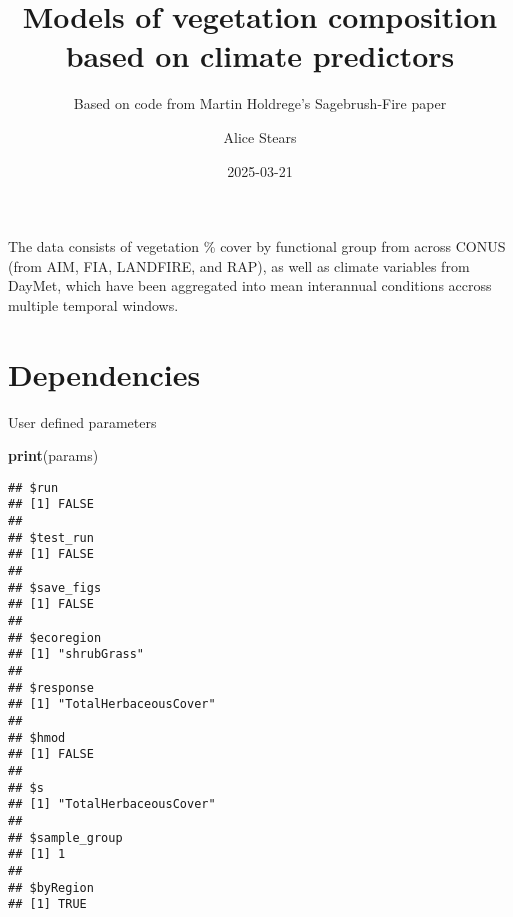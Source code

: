 \documentclass[
]{article}
\title{Models of vegetation composition based on climate predictors}
\subtitle{Based on code from Martin Holdrege's Sagebrush-Fire paper}
\author{Alice Stears}
\date{2025-03-21}
\newenvironment{Shaded}{\begin{snugshade}}{\end{snugshade}}
\newcommand{\FunctionTok}[1]{\textcolor[rgb]{0.13,0.29,0.53}{\textbf{#1}}}
\newcommand{\NormalTok}[1]{#1}
\begin{document}
\maketitle

{
\setcounter{tocdepth}{2}
\tableofcontents
}
The data consists of vegetation \% cover by functional group from across
CONUS (from AIM, FIA, LANDFIRE, and RAP), as well as climate variables
from DayMet, which have been aggregated into mean interannual conditions
accross multiple temporal windows.

\section{Dependencies}\label{dependencies}

User defined parameters

\begin{Shaded}
\begin{Highlighting}[]
\FunctionTok{print}\NormalTok{(params)}
\end{Highlighting}
\end{Shaded}

\begin{verbatim}
## $run
## [1] FALSE
## 
## $test_run
## [1] FALSE
## 
## $save_figs
## [1] FALSE
## 
## $ecoregion
## [1] "shrubGrass"
## 
## $response
## [1] "TotalHerbaceousCover"
## 
## $hmod
## [1] FALSE
## 
## $s
## [1] "TotalHerbaceousCover"
## 
## $sample_group
## [1] 1
## 
## $byRegion
## [1] TRUE
\end{verbatim}
\end{document}
